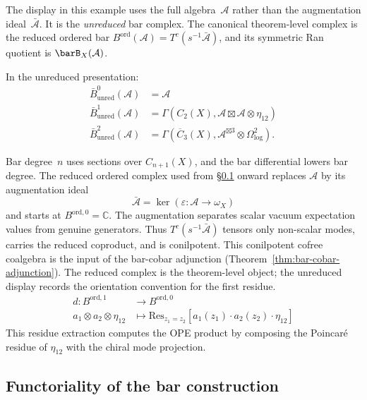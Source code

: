 \begin{example}\label{ex:bar-unreduced-low-degrees}
The display in this example uses the full algebra~$\mathcal{A}$ rather
than the augmentation ideal~$\bar{\mathcal{A}}$. It is the
\emph{unreduced} bar complex. The canonical theorem-level complex is
the reduced ordered bar
$B^{\mathrm{ord}}(\mathcal{A}) = T^c(s^{-1}\bar{\mathcal{A}})$,
and its symmetric Ran quotient is $\barB_X(\mathcal{A})$.

In the unreduced presentation:
\begin{align}
\bar{B}^0_{\mathrm{unred}}(\mathcal{A}) &= \mathcal{A} \\
\bar{B}^1_{\mathrm{unred}}(\mathcal{A}) &= \Gamma(C_2(X), \mathcal{A} \boxtimes \mathcal{A} \otimes \eta_{12}) \\
\bar{B}^2_{\mathrm{unred}}(\mathcal{A}) &= \Gamma(\overline{C}_3(X), \mathcal{A}^{\boxtimes 3} \otimes \Omega^2_{\log}).
\end{align}

Bar degree~$n$ uses sections over $C_{n+1}(X)$, and the bar
differential lowers bar degree. The reduced ordered complex used from
\S\ref{subsec:bar-functoriality} onward replaces $\mathcal{A}$ by its
augmentation ideal
\[
\bar{\mathcal A}=\ker(\varepsilon\colon\mathcal A\to\omega_X)
\]
and starts at $B^{\mathrm{ord},0}=\mathbb C$. The augmentation separates scalar
vacuum expectation values from genuine generators. Thus
$T^c(s^{-1}\bar{\mathcal A})$ tensors only non-scalar modes, carries
the reduced coproduct, and is conilpotent. This conilpotent cofree
coalgebra is the input of the bar-cobar adjunction
\textup{(}Theorem~\textup{\ref{thm:bar-cobar-adjunction}}\textup{)}.
The reduced complex is the theorem-level object; the unreduced display
records the orientation convention for the first residue.
\begin{align}
d: B^{\mathrm{ord},1} &\to B^{\mathrm{ord},0} \\
a_1 \otimes a_2 \otimes \eta_{12} &\mapsto \text{Res}_{z_1=z_2}[a_1(z_1) \cdot a_2(z_2) \cdot \eta_{12}]
\end{align}
This residue extraction computes the OPE product by composing the
Poincar\'e residue of $\eta_{12}$ with the chiral mode projection.
\end{example}

\subsection{Functoriality of the bar construction}
\label{subsec:bar-functoriality}


